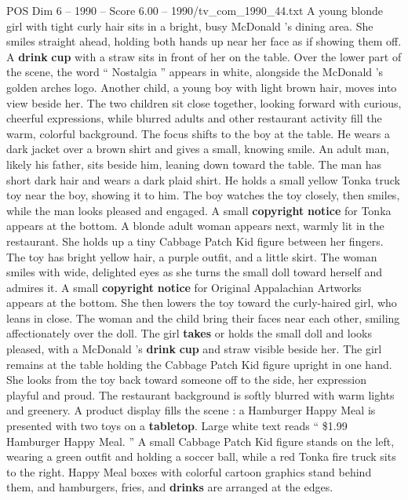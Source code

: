 \begin{textsample}{POS Dim 6 – 1990 – Score 6.00 – 1990/tv\_com\_1990\_44.txt}  \label{ex:f6_pos_077}
A young blonde girl with tight curly hair sits in a bright, busy McDonald ’s dining area.
She smiles straight ahead, holding both hands up near her face as if showing them off.
A \textbf{drink} \textbf{cup} with a straw sits in front of her on the table.
Over the lower part of the scene, the word “ Nostalgia ” appears in white, alongside the McDonald ’s golden arches logo.
Another child, a young boy with light brown hair, moves into view beside her.
The two children sit close together, looking forward with curious, cheerful expressions, while blurred adults and other restaurant activity fill the warm, colorful background.
The focus shifts to the boy at the table.
He wears a dark jacket over a brown shirt and gives a small, knowing smile.
An adult man, likely his father, sits beside him, leaning down toward the table.
The man has short dark hair and wears a dark plaid shirt.
He holds a small yellow Tonka truck toy near the boy, showing it to him.
The boy watches the toy closely, then smiles, while the man looks pleased and engaged.
A small \textbf{copyright} \textbf{notice} for Tonka appears at the bottom.
A blonde adult woman appears next, warmly lit in the restaurant.
She holds up a tiny Cabbage Patch Kid figure between her fingers.
The toy has bright yellow hair, a purple outfit, and a little skirt.
The woman smiles with wide, delighted eyes as she turns the small doll toward herself and admires it.
A small \textbf{copyright} \textbf{notice} for Original Appalachian Artworks appears at the bottom.
She then lowers the toy toward the curly-haired girl, who leans in close.
The woman and the child bring their faces near each other, smiling affectionately over the doll.
The girl \textbf{takes} or holds the small doll and looks pleased, with a McDonald ’s \textbf{drink} \textbf{cup} and straw visible beside her.
The girl remains at the table holding the Cabbage Patch Kid figure upright in one hand.
She looks from the toy back toward someone off to the side, her expression playful and proud.
The restaurant background is softly blurred with warm lights and greenery.
A product display fills the scene : a Hamburger Happy Meal is presented with two toys on a \textbf{tabletop}.
Large white text reads “ \$1.99 Hamburger Happy Meal. ” A small Cabbage Patch Kid figure stands on the left, wearing a green outfit and holding a soccer ball, while a red Tonka fire truck sits to the right.
Happy Meal boxes with colorful cartoon graphics stand behind them, and hamburgers, fries, and \textbf{drinks} are arranged at the edges.

\end{textsample}

